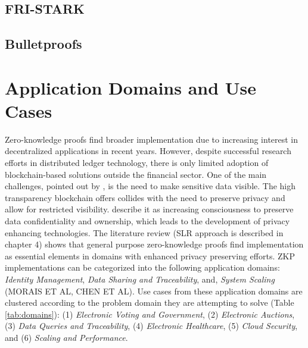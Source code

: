 \subsection{FRI-STARK}

\subsection{Bulletproofs}

\section{Application Domains and Use Cases}
Zero-knowledge proofs find broader implementation due to increasing interest in decentralized applications in recent years. However, despite successful research efforts in distributed ledger technology, there is only limited adoption of blockchain-based solutions outside the financial sector. One of the main challenges, pointed out by \citet{SedlmeirTransparencyChallenge}, is the need to make sensitive data visible. The high transparency blockchain offers collides with the need to preserve privacy and allow for restricted visibility. \citet{Godden} describe it as increasing consciousness to preserve data confidentiality and ownership, which leads to the development of privacy enhancing technologies. The literature review (SLR approach is described in chapter 4) shows that general purpose zero-knowledge proofs find implementation as essential elements in domains with enhanced privacy preserving efforts. ZKP implementations can be categorized into the following application domains: \textit{Identity Management}, \textit{Data Sharing and Traceability}, and, \textit{System Scaling} \citep{PipeZK}(MORAIS ET AL, CHEN ET AL). Use cases from these application domains are clustered according to the problem domain they are attempting to solve (Table \ref{tab:domains}): (1) \textit{Electronic Voting and Government}, (2) \textit{Electronic Auctions}, (3) \textit{Data Queries and Traceability}, (4) \textit{Electronic Healthcare}, (5) \textit{Cloud Security}, and (6) \textit{Scaling and Performance}.

